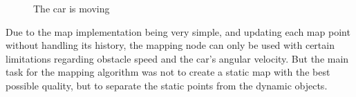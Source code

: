 \begin{figure}[!ht]
    \centering
    \caption{The car is moving}
    \label{mapping_demo_car_moving}
\end{figure}

Due to the map implementation being very simple, and updating each map point without handling its history, the mapping node can only be used with certain limitations regarding obstacle speed and the car's angular velocity. But the main task for the mapping algorithm was not to create a static map with the best possible quality, but to separate the static points from the dynamic objects.